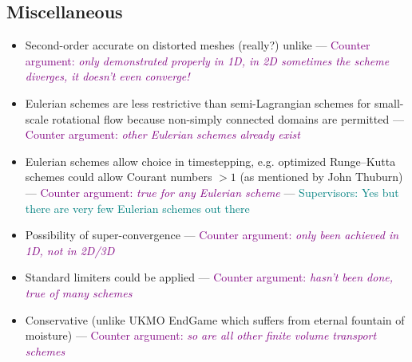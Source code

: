 \documentclass{article}
\newcommand{\TODO}[1]{\textcolor{purple}{Counter argument: \emph{#1}}}
\newcommand{\svisor}[1]{\textcolor{teal}{Supervisors: #1}}
\begin{document}
\subsection*{Miscellaneous}
\begin{itemize}
	\item Second-order accurate on distorted meshes (really?) unlike \citep{skamarock-gassmann2011} --- \TODO{only demonstrated properly in 1D, in 2D sometimes the scheme diverges, it doesn't even converge!}
	\item Eulerian schemes are less restrictive than semi-Lagrangian schemes for small-scale rotational flow because non-simply connected domains are permitted \citep{lauritzen2011book} --- \TODO{other Eulerian schemes already exist}
	\item Eulerian schemes allow choice in timestepping, e.g. optimized Runge--Kutta schemes could allow Courant numbers $> 1$ (as mentioned by John Thuburn) --- \TODO{true for any Eulerian scheme} --- \svisor{Yes but there are very few Eulerian schemes out there}
	\item Possibility of super-convergence --- \TODO{only been achieved in 1D, not in 2D/3D}
	\item Standard limiters could be applied --- \TODO{hasn't been done, true of many schemes}
	\item Conservative (unlike UKMO EndGame which suffers from eternal fountain of moisture) --- \TODO{so are all other finite volume transport schemes}
\end{itemize}




\end{document}
